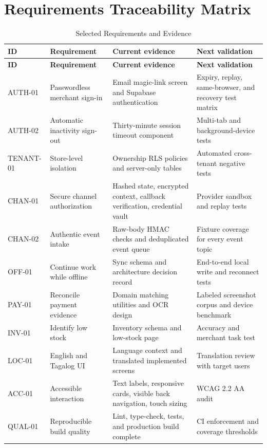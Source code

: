 \documentclass[12pt,oneside]{report}
\begin{document}
\chapter{Requirements Traceability Matrix}
\begin{longtable}{L{0.14\textwidth}L{0.31\textwidth}L{0.24\textwidth}L{0.20\textwidth}}
\caption{Selected Requirements and Evidence}\label{tab:traceability}\\
\toprule
\textbf{ID} & \textbf{Requirement} & \textbf{Current evidence} & \textbf{Next validation} \\
\midrule
\endfirsthead
\toprule
\textbf{ID} & \textbf{Requirement} & \textbf{Current evidence} & \textbf{Next validation} \\
\midrule
\endhead
AUTH-01 & Passwordless merchant sign-in & Email magic-link screen and Supabase
authentication & Expiry, replay, same-browser, and recovery test matrix \\
AUTH-02 & Automatic inactivity sign-out & Thirty-minute session timeout component
& Multi-tab and background-device tests \\
TENANT-01 & Store-level isolation & Ownership RLS policies and server-only tables
& Automated cross-tenant negative tests \\
CHAN-01 & Secure channel authorization & Hashed state, encrypted context, callback
verification, credential vault & Provider sandbox and replay tests \\
CHAN-02 & Authentic event intake & Raw-body HMAC checks and deduplicated event
queue & Fixture coverage for every event topic \\
OFF-01 & Continue work while offline & Sync schema and architecture decision
record & End-to-end local write and reconnect tests \\
PAY-01 & Reconcile payment evidence & Domain matching utilities and OCR design
& Labeled screenshot corpus and device benchmark \\
INV-01 & Identify low stock & Inventory schema and low-stock page & Accuracy and
merchant task test \\
LOC-01 & English and Tagalog UI & Language context and translated implemented
screens & Translation review with target users \\
ACC-01 & Accessible interaction & Text labels, responsive cards, visible back
navigation, touch sizing & WCAG 2.2 AA audit \\
QUAL-01 & Reproducible build quality & Lint, type-check, tests, and production
build complete & CI enforcement and coverage thresholds \\
\bottomrule
\end{longtable}
\end{document}
